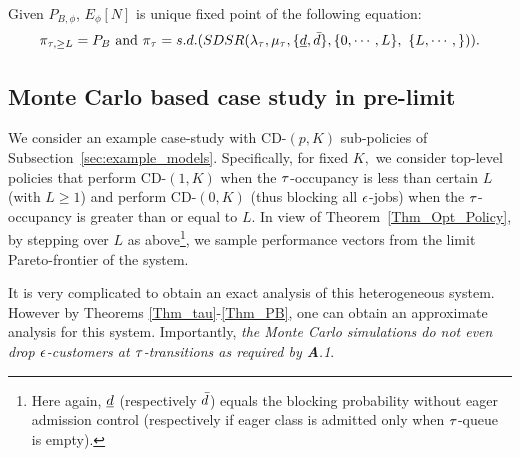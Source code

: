 { Given $P_{B, \phi}$, $E_\phi[N]$ is unique fixed point of the following equation:
 $$
 \pi_{\t, \ge  L} = P_B \mbox { and  }  \pi_\t = s.d. ( SDSR (\lambda_\t, \mu_\t,  \{\dmin, \dmax\},  \{0, \cdots, L\}, \ \{L, \cdots, \} ) ).
 $$
}
%




 
\subsection{Monte Carlo  based  case study in pre-limit}

We consider an example case-study with CD-$(p, K)$ sub-policies of
Subsection~\ref{sec:example_models}. Specifically, for fixed $K,$ we
consider top-level policies that perform CD-$(1,K)$ when the
${\tau}$-occupancy is less than certain $L $ (with $L\ge 1$) and perform
CD-$(0,K)$ (thus blocking all ${ \epsilon }$-jobs) when the ${\tau}$-occupancy is
greater than or equal to $L.$ In view of Theorem~\ref{Thm_Opt_Policy},
by stepping over $L$ as above\footnote{ Here again, ${\underline d}$
  (respectively ${\bar d}$) equals the blocking probability without eager
  admission control (respectively if eager class is admitted only when
  ${\tau}$-queue is empty).}, we sample performance vectors from the limit
Pareto-frontier of the system.
 


It is very complicated to obtain an exact analysis of this
heterogeneous system. However by Theorems \ref{Thm_tau}-\ref{Thm_PB},
one can obtain an approximate analysis for this system.  Importantly, {\it the Monte
  Carlo simulations do not even drop ${ \epsilon }$-customers at
  ${\tau}$-transitions as required by {\bf A}.1}.


